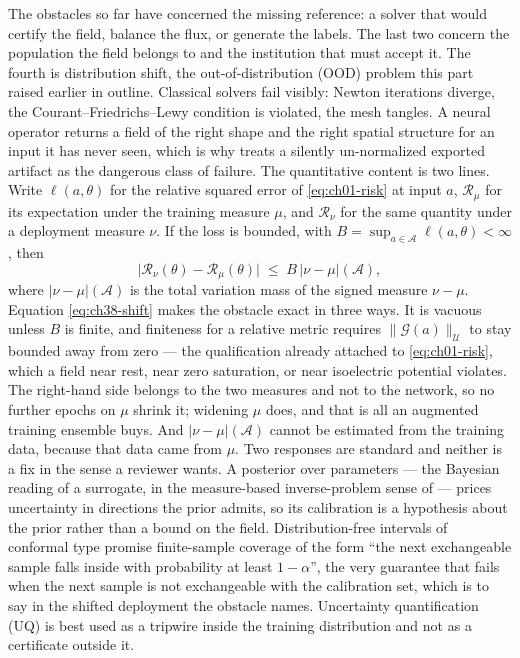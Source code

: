 The obstacles so far have concerned the missing reference: a solver that would certify the
field, balance the flux, or generate the labels. The last two concern the population the
field belongs to and the institution that must accept it. The fourth is distribution shift,
the out-of-distribution (OOD) problem this part raised earlier in outline. Classical
solvers fail visibly: Newton iterations diverge, the Courant--Friedrichs--Lewy condition is
violated, the mesh tangles. A neural operator returns
a field of the right shape and the right spatial structure for an input it has never seen,
which is why
 treats a silently
un-normalized exported artifact as the dangerous class of failure. The quantitative content is
two lines. Write $\ell(a,\theta)$ for the relative squared error of \eqref{eq:ch01-risk} at
input $a$, $\mathcal{R}_{\mu}$ for its expectation under the training measure $\mu$, and
$\mathcal{R}_{\nu}$ for the same quantity under a deployment measure $\nu$. If the loss is
bounded, with $B=\sup_{a\in\mathcal{A}}\ell(a,\theta)<\infty$, then
\begin{equation}
  \big|\mathcal{R}_{\nu}(\theta)-\mathcal{R}_{\mu}(\theta)\big|
  \;\le\;
  B\,\big|\nu-\mu\big|(\mathcal{A}),
  \label{eq:ch38-shift}
\end{equation}
where $|\nu-\mu|(\mathcal{A})$ is the total variation mass of the signed measure
$\nu-\mu$.
Equation \eqref{eq:ch38-shift} makes the obstacle exact in three ways. It is vacuous unless
$B$ is finite, and finiteness for a relative metric requires $\|\mathcal{G}(a)\|_{\mathcal{U}}$
to stay bounded away from zero --- the qualification already attached to \eqref{eq:ch01-risk},
which a field near rest, near zero saturation, or near isoelectric potential violates. The
right-hand side belongs to the two measures and not to the network, so no further epochs on
$\mu$ shrink it; widening $\mu$ does, and that is all an augmented
training ensemble buys. And $|\nu-\mu|(\mathcal{A})$ cannot be estimated from the training
data, because that data came from $\mu$. Two responses are standard and neither is a fix in
the sense a reviewer wants. A posterior over parameters --- the Bayesian reading of a surrogate,
in the measure-based inverse-problem sense of \cite{stuart2010inverse} --- prices uncertainty in
directions the prior admits, so its calibration is a hypothesis about the prior rather than a
bound on the field. Distribution-free intervals of conformal type promise finite-sample
coverage of the form ``the next exchangeable sample falls inside with probability at least
$1-\alpha$'', the very guarantee that fails when the next sample is not exchangeable with the
calibration set, which is to say in the shifted deployment the obstacle names. Uncertainty
quantification (UQ) is best used as a tripwire inside the training distribution and not as a
certificate outside
it.

